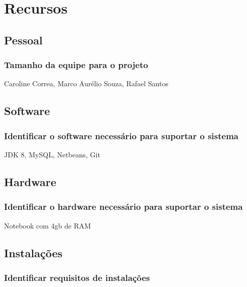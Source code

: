 \chapter{Recursos}

\section{Pessoal}

\subsection{Tamanho da equipe para o projeto }

Caroline Correa, Marco Aurélio Souza, Rafael Santos

\section{Software}

\subsection{Identificar o software necessário para suportar o sistema}

JDK 8, MySQL, Netbeans, Git

\section{Hardware}

\subsection{Identificar o hardware necessário para suportar o sistema}

Notebook com 4gb de RAM

\section{Instalações}

\subsection{Identificar requisitos de instalações}

